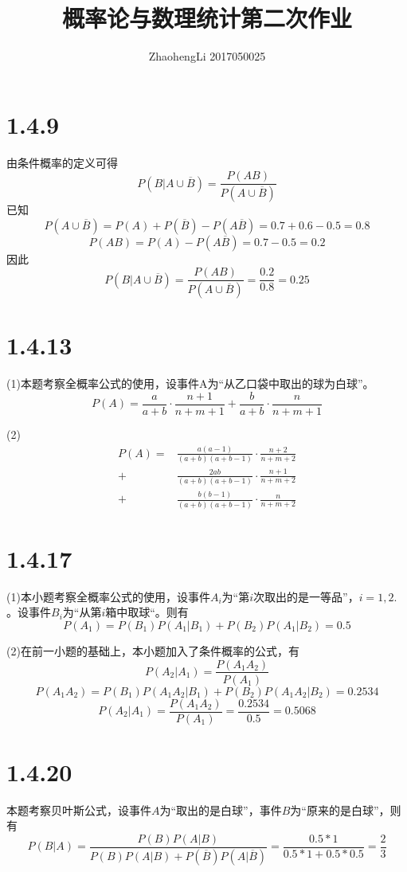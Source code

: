 \documentclass{article}
\title{概率论与数理统计第二次作业}
\author{ZhaohengLi 2017050025}
\begin{document}
\maketitle
\section{1.4.9}
由条件概率的定义可得
$$P(B|A\cup \overline{B})=\frac{P(AB)}{P(A\cup \overline{B})}$$
已知
$$P(A \cup \overline B)=P(A)+P(\overline B)-P(A\overline B)=0.7+0.6-0.5=0.8$$
$$P(AB)=P(A)-P(A\overline B)=0.7-0.5=0.2$$
因此
$$P(B|A\cup \overline{B})=\frac{P(AB)}{P(A\cup \overline{B})}=\frac{0.2}{0.8}=0.25$$

\section{1.4.13}
(1)本题考察全概率公式的使用，设事件A为“从乙口袋中取出的球为白球”。
$$P(A)=\frac{a}{a+b}\cdot\frac{n+1}{n+m+1}+\frac{b}{a+b}\cdot\frac{n}{n+m+1}$$


(2)
\begin{equation}
\begin{aligned}
P(A)=&\frac{a(a-1)}{(a+b)(a+b-1)}\cdot\frac{n+2}{n+m+2}\\
+&\frac{2ab}{(a+b)(a+b-1)}\cdot\frac{n+1}{n+m+2}\\
+&\frac{b(b-1)}{(a+b)(a+b-1)}\cdot\frac{n}{n+m+2}
\end{aligned}
\end{equation}

\section{1.4.17}
(1)本小题考察全概率公式的使用，设事件$A_{i}$为“第$i$次取出的是一等品”，$i=1,2.$。设事件$B_{i}$为“从第$i$箱中取球“。则有
$$P(A_{1})=P(B_{1})P(A_{1}|B_{1})+P(B_{2})P(A_{1}|B_{2})=0.5$$


(2)在前一小题的基础上，本小题加入了条件概率的公式，有
$$P(A_{2}|A_{1})=\frac{P(A_{1}A_{2})}{P(A_{1})}$$
$$P(A_{1}A_{2})=P(B_{1})P(A_{1}A_{2}|B_{1})+P(B_{2})P(A_{1}A_{2}|B_{2})=0.2534$$
$$P(A_{2}|A_{1})=\frac{P(A_{1}A_{2})}{P(A_{1})}=\frac{0.2534}{0.5}=0.5068$$

\section{1.4.20}
本题考察贝叶斯公式，设事件$A$为“取出的是白球”，事件$B$为“原来的是白球”，则有
$$P(B|A)=\frac{P(B)P(A|B)}{P(B)P(A|B)+P(\overline B)P(A|\overline B)}=\frac{0.5*1}{0.5*1+0.5*0.5}=\frac{2}{3}$$
\end{document}
